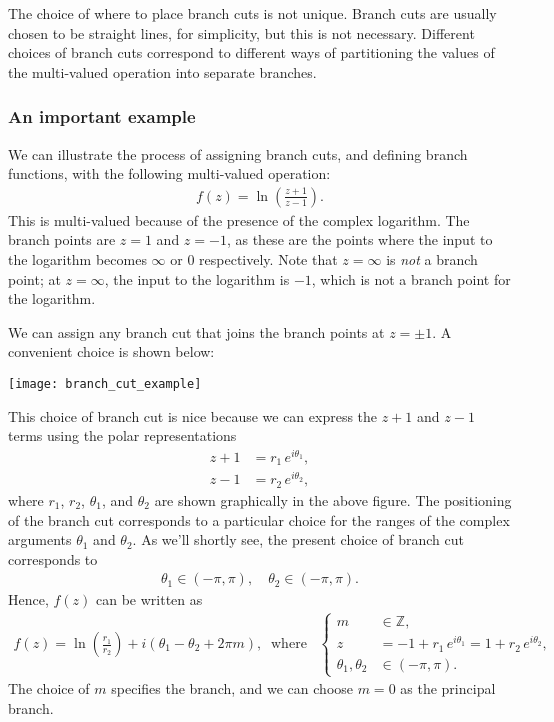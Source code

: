 \documentclass[10pt,a4paper]{article}
\begin{document}
\noindent
The choice of where to place branch cuts is not unique.  Branch cuts
are usually chosen to be straight lines, for simplicity, but this is
not necessary. Different choices of branch cuts correspond to
different ways of partitioning the values of the multi-valued
operation into separate branches.

\subsubsection{An important example}
\label{an-important-example}

We can illustrate the process of assigning branch cuts, and defining
branch functions, with the following multi-valued operation:
\begin{align}
  f(z) = \ln\left(\frac{z+1}{z-1}\right).
\end{align}
This is multi-valued because of the presence of the complex
logarithm. The branch points are $z = 1$ and $z = -1$, as these are
the points where the input to the logarithm becomes $\infty$ or $0$
respectively. Note that $z = \infty$ is \textit{not} a branch point;
at $z = \infty$, the input to the logarithm is $-1$, which is not a
branch point for the logarithm.

We can assign any branch cut that joins the branch points at $z = \pm
1$.  A convenient choice is shown below:

\begin{center}
  \texttt{[image: branch\_cut\_example]}
\end{center}

This choice of branch cut is nice because we can express the $z+1$ and
$z - 1$ terms using the polar representations
\begin{align}
  z + 1 &= r_1\,e^{i\theta_1}, \\
  z - 1 &= r_2\, e^{i\theta_2},
\end{align}
where $r_1$, $r_2$, $\theta_1$, and $\theta_2$ are shown graphically
in the above figure. The positioning of the branch cut corresponds to
a particular choice for the ranges of the complex arguments $\theta_1$
and $\theta_2$.  As we'll shortly see, the present choice of branch
cut corresponds to
\begin{align}
  \theta_1 \in (-\pi,\pi), \quad \theta_2 \in (-\pi,\pi).
\end{align}
Hence, $f(z)$ can be written as
\begin{align}
  f(z) = \ln\left(\frac{r_1}{r_2}\right) + i(\theta_1 - \theta_2 + 2\pi m), \;\;\mathrm{where}\;\;\;\left\{\begin{aligned} m &\in\mathbb{Z},\\ z &= -1 + r_1\,e^{i\theta_1} = 1 + r_2\,e^{i\theta_2},\\ \theta_1, \theta_2 &\in (-\pi,\pi).\end{aligned}\right.
\end{align}
The choice of $m$ specifies the branch, and we can choose $m = 0$ as
the principal branch.
\end{document}
